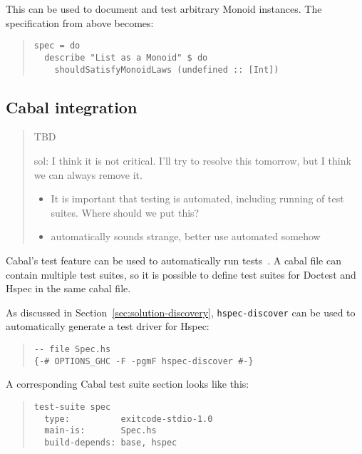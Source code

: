 \documentclass[preprint]{sigplanconf}
\begin{document}
\noindent This can be used to document and test arbitrary Monoid
instances.
The specification from above becomes:

\begin{quote}
\small
\begin{verbatim}
spec = do
  describe "List as a Monoid" $ do
    shouldSatisfyMonoidLaws (undefined :: [Int])
\end{verbatim}
\end{quote}

\subsection{Cabal integration}

\begin{quote}
    TBD

    sol: I think it is not critical.  I'll try to resolve this
    tomorrow, but I think we can always remove it.

\begin{itemize}

\item It is important that testing is automated, including running of test
    suites.  Where should we put this?

\item automatically sounds strange, better use automated somehow
\end{itemize}
\end{quote}

\noindent Cabal's test feature can be used to automatically run tests~\cite{cabal}.  A cabal
file can contain multiple test suites, so it is possible to define test suites
for Doctest and Hspec in the same cabal file.

As discussed in Section~\ref{sec:solution-discovery},
{\tt hspec-discover} can be used to automatically generate a test
driver for Hspec:

\begin{quote}
\small
\begin{verbatim}
-- file Spec.hs
{-# OPTIONS_GHC -F -pgmF hspec-discover #-}
\end{verbatim}
\end{quote}

\noindent A corresponding Cabal test suite section looks like this:

\begin{quote}
\small
\begin{verbatim}
test-suite spec
  type:          exitcode-stdio-1.0
  main-is:       Spec.hs
  build-depends: base, hspec
\end{verbatim}
\end{quote}
\end{document}
